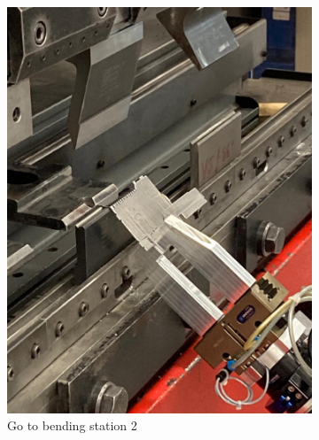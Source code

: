 \begin{figure}[h]
    \centering
    \begin{subfigure}[b]{0.32\textwidth}
        \centering
        \includegraphics[width=\textwidth]{figures/bending/bending3-001.png}
        \caption{Go to bending station 2}
        \label{subfig:bending3-before}
    \end{subfigure}\hspace{0.1cm}
    \begin{subfigure}[b]{0.32\textwidth}
        \centering

\end{subfigure}
\end{figure}
